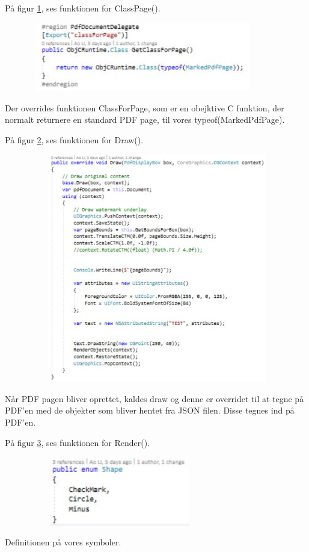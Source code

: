 På figur \ref{fig:ClassPage}, ses funktionen for ClassPage().
\begin{figure}[H] %
	\centering
	\includegraphics[height=3cm, width=10cm]{../ArkitekturDesign/Design/RegisterPDF/ClassPage}
	\caption{}
	\label{fig:ClassPage}
\end{figure}
Der overrides funktionen ClassForPage, som er en obejktive C funktion, der normalt returnere en standard PDF page, til vores typeof(MarkedPdfPage).

På figur \ref{fig:Draw}, ses funktionen for Draw().
\begin{figure}[H] %
	\centering
	\includegraphics[height=10cm, width=15cm]{../ArkitekturDesign/Design/RegisterPDF/Draw}
	\caption{}
	\label{fig:Draw}
\end{figure}
Når PDF pagen bliver oprettet, kaldes draw og denne er overridet til at tegne på PDF'en med de objekter som bliver hentet fra JSON filen. Disse tegnes ind på PDF'en.

\clearpage

På figur \ref{fig:Enum}, ses funktionen for Render().
\begin{figure}[H] %
	\centering
	\includegraphics[height=3cm, width=8cm]{../ArkitekturDesign/Design/RegisterPDF/Enum}
	\caption{}
	\label{fig:Enum}
\end{figure}
Definitionen på vores symboler.